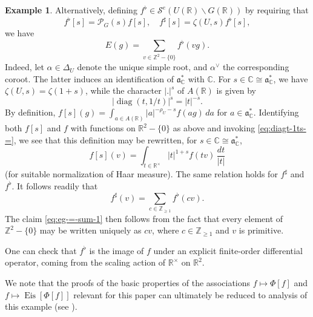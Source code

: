\documentclass[reqno]{amsart}
\DeclareMathOperator{\diag}{diag}
\DeclareMathOperator{\Eis}{Eis}
\theoremstyle{plain} \newtheorem{theorem} {Theorem}
\theoremstyle{definition} \newtheorem{definition} [theorem] {Definition}
\newtheorem{example} [theorem] {Example}
\theoremstyle{itplain} %
\numberwithin{equation}{section}
\numberwithin{theorem}{section}
\renewcommand{\geq}{\geqslant}
\begin{document}
\begin{example}
  Alternatively, defining $f^{\flat} \in \mathcal{S}^e(U(\mathbb{R}) \backslash G(\mathbb{R}))$ by requiring that
  \begin{equation*}
    f^{\flat}[s] = \mathcal{P}_G(s) f[s],
    \quad
    f ^\sharp [s] = \zeta(U,s) f^{\flat}[s],
  \end{equation*}
  we have
  \begin{equation}\label{eq:eg-=-sum-1}
    E(g) = \sum _{v \in \mathbb{Z}^2 - \{0\}} f^{\flat}(v g).
  \end{equation}
  Indeed, let $\alpha \in \Delta_U$ denote the unique simple root, and $\alpha^\vee$ the corresponding coroot.  The latter induces an identification of $\mathfrak{a}_{\mathbb{C}}^*$ with $\mathbb{C}$.  For $s \in \mathbb{C} \cong \mathfrak{a}_{\mathbb{C}}^*$, we have $\zeta(U,s) = \zeta(1 + s)$, while the character $|.|^s$ of $A(\mathbb{R})$ is given by
  \begin{equation}\label{eq:diagt-1ts-=}
    |\diag(t, 1/t)|^s = |t|^{-s}.
  \end{equation}
  By definition, $f[s](g) = \int _{a \in A(\mathbb{R})} |a|^{-\rho_U - s} f(a g) \, d a$ for $a \in \mathfrak{a}_{\mathbb{C}}^*$.  Identifying both $f[s]$ and $f$ with functions on $\mathbb{R}^2 - \{0\}$ as above and invoking \eqref{eq:diagt-1ts-=}, we see that this definition may be rewritten, for $s \in \mathbb{C} \cong \mathfrak{a}_{\mathbb{C}}^*$,
  \begin{equation*}
    f[s](v) = \int _{t \in \mathbb{R}^\times } |t|^{1+s} f(t v) \, \frac{d t}{|t|}
  \end{equation*}
  (for suitable normalization of Haar measure).  The same relation holds for $f ^\sharp$ and $f^{\flat}$.  It follows readily that
  \begin{equation*}
    f ^\sharp (v) = \sum _{c \in \mathbb{Z}_{\geq 1} } f^{\flat} (c v).
  \end{equation*}
  The claim \eqref{eq:eg-=-sum-1} then follows from the fact that every element of $\mathbb{Z} ^2 - \{0\}$ may be written uniquely as $c v$, where $c \in \mathbb{Z}_{\geq 1}$ and $v$ is primitive.
  
  One can check that $f ^\flat$ is the image of $f$ under an explicit finite-order differential operator, coming from the scaling action of $\mathbb{R}^\times$ on $\mathbb{R}^2$.

  We note that the proofs of the basic properties of the associations $f \mapsto \Phi[f]$ and $f \mapsto \Eis[\Phi[f]]$ relevant for this paper can ultimately be reduced to analysis of this example (see \cite[\S3.5]{MR3468638}).
\end{example}
\end{document}
